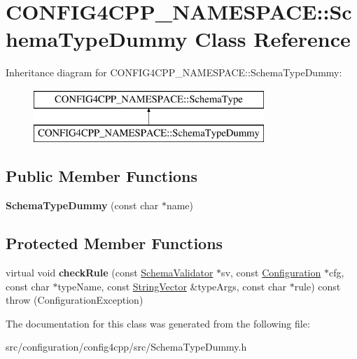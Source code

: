 \hypertarget{classCONFIG4CPP__NAMESPACE_1_1SchemaTypeDummy}{\section{C\-O\-N\-F\-I\-G4\-C\-P\-P\-\_\-\-N\-A\-M\-E\-S\-P\-A\-C\-E\-:\-:Schema\-Type\-Dummy Class Reference}
\label{classCONFIG4CPP__NAMESPACE_1_1SchemaTypeDummy}
}
Inheritance diagram for C\-O\-N\-F\-I\-G4\-C\-P\-P\-\_\-\-N\-A\-M\-E\-S\-P\-A\-C\-E\-:\-:Schema\-Type\-Dummy\-:\begin{figure}[H]
\begin{center}
\leavevmode
\includegraphics[height=2.000000cm]{classCONFIG4CPP__NAMESPACE_1_1SchemaTypeDummy}
\end{center}
\end{figure}
\subsection*{Public Member Functions}
\begin{DoxyCompactItemize}
\item 
\hypertarget{classCONFIG4CPP__NAMESPACE_1_1SchemaTypeDummy_ab478e0fbf1d8e3364fca9c5ee8bbcc01}{{\bfseries Schema\-Type\-Dummy} (const char $\ast$name)}\label{classCONFIG4CPP__NAMESPACE_1_1SchemaTypeDummy_ab478e0fbf1d8e3364fca9c5ee8bbcc01}

\end{DoxyCompactItemize}
\subsection*{Protected Member Functions}
\begin{DoxyCompactItemize}
\item 
\hypertarget{classCONFIG4CPP__NAMESPACE_1_1SchemaTypeDummy_ae5e027c3a7207a8c197df57631daa2c0}{virtual void {\bfseries check\-Rule} (const \hyperlink{classCONFIG4CPP__NAMESPACE_1_1SchemaValidator}{Schema\-Validator} $\ast$sv, const \hyperlink{classCONFIG4CPP__NAMESPACE_1_1Configuration}{Configuration} $\ast$cfg, const char $\ast$type\-Name, const \hyperlink{classCONFIG4CPP__NAMESPACE_1_1StringVector}{String\-Vector} \&type\-Args, const char $\ast$rule) const   throw (\-Configuration\-Exception)}\label{classCONFIG4CPP__NAMESPACE_1_1SchemaTypeDummy_ae5e027c3a7207a8c197df57631daa2c0}

\end{DoxyCompactItemize}


The documentation for this class was generated from the following file\-:\begin{DoxyCompactItemize}
\item 
src/configuration/config4cpp/src/Schema\-Type\-Dummy.\-h\end{DoxyCompactItemize}
